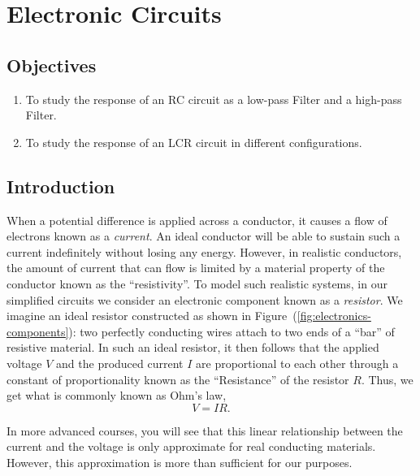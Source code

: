 \chapter{Electronic Circuits}

\section*{Objectives}

\begin{enumerate}
\item To study the response of an RC circuit as a low-pass Filter and a high-pass Filter.
\item To study the response of an LCR circuit in different configurations.
\end{enumerate}


\section*{Introduction}

When a potential difference is applied across a conductor, it causes a flow of electrons known as a \textsl{current}. An ideal conductor will be able to sustain such a current indefinitely without losing any energy. However, in realistic conductors, the amount of current that can flow is limited by a material property of the conductor known as the ``resistivity''. To model such realistic systems, in our simplified circuits we consider an electronic component known as a \textsl{resistor}. We imagine an ideal resistor constructed as shown in Figure~(\ref{fig:electronics-components}): two perfectly conducting wires attach to two ends of a ``bar'' of resistive material. In such an ideal resistor, it then follows that the applied voltage $V$ and the produced current $I$ are proportional to each other through a constant of proportionality known as the ``Resistance'' of the resistor $R$. Thus, we get what is commonly known as Ohm's law,
\begin{equation}
    V = I R.
    \label{eqn:ohms-law}
\end{equation}

In more advanced courses, you will see that this linear relationship between the current and the voltage is only approximate for real conducting materials. However, this approximation is more than sufficient for our purposes.


